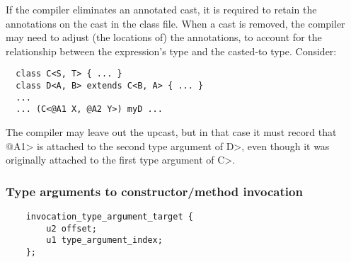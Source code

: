 \documentclass[10pt]{article}
\begin{document}
If the compiler eliminates an annotated cast, it is required to retain the
annotations on the cast in the class file.  When a cast is removed, the
compiler may need to adjust (the locations of) the annotations, to account
for the relationship between the expression's type and the casted-to type.
Consider:

\preverbnegspace
\begin{Verbatim}
  class C<S, T> { ... }
  class D<A, B> extends C<B, A> { ... }
  ...
  ... (C<@A1 X, @A2 Y>) myD ...
\end{Verbatim}

\noindent
The compiler may leave out the upcast, but in that case it must record that
\<@A1> is attached to the second type argument of \<D>, even though it was
originally attached to the first type argument of \<C>.




\subsubsection{Type arguments to constructor/method invocation\label{class-file:ext:ri:con-typearg}}


\preverbnegspace
\begin{Verbatim}
    invocation_type_argument_target {
        u2 offset;
        u1 type_argument_index;
    };
\end{Verbatim}
\end{document}
